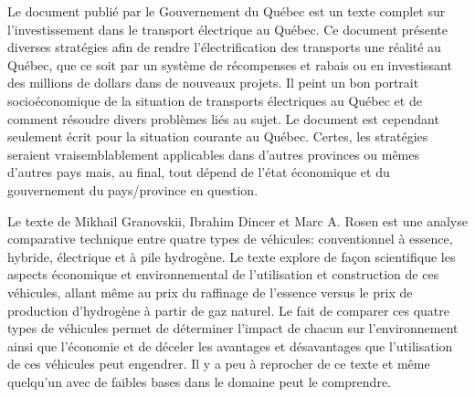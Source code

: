 Le document  publié par le Gouvernement du Québec est un texte complet sur l'investissement dans le transport électrique au Québec. Ce document présente diverses stratégies afin de rendre l'électrification des transports une réalité au Québec, que ce soit par un système de récompenses et rabais ou en investissant des millions de dollars dans de nouveaux projets. Il peint un bon portrait socioéconomique de la situation de transports électriques au Québec et de comment résoudre divers problèmes liés au sujet. Le document est cependant seulement écrit pour la situation courante au Québec. Certes, les stratégies seraient vraisemblablement applicables dans d'autres provinces ou mêmes d'autres pays mais, au final, tout dépend de l'état économique et du gouvernement du pays/province en question.

Le texte  de Mikhail Granovskii, Ibrahim Dincer et Marc A. Rosen est une analyse comparative technique entre quatre types de véhicules: conventionnel à essence, hybride, électrique et à pile hydrogène. Le texte explore de façon scientifique les aspects économique et environnemental de l'utilisation et construction de ces véhicules, allant même au prix du raffinage de l'essence versus le prix de production d'hydrogène à partir de gaz naturel. Le fait de comparer ces quatre types de véhicules permet de déterminer l'impact de chacun sur l'environnement ainsi que l'économie et de déceler les avantages et désavantages que l'utilisation de ces véhicules peut engendrer. Il y a peu à reprocher de ce texte et même quelqu'un avec de faibles bases dans le domaine peut le comprendre.
